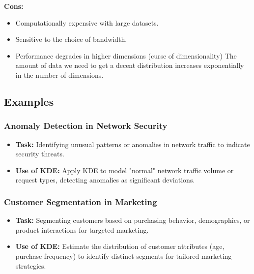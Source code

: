 \documentclass[12pt]{article}
\begin{document}
\textbf{Cons:}
\begin{itemize}
    \item Computationally expensive with large datasets.
    \item Sensitive to the choice of bandwidth.
 	\item Performance degrades in higher dimensions (curse of dimensionality) The amount of data we need to get a decent distribution increases exponentially in the number of dimensions.
\end{itemize}
\subsection{Examples}

\subsubsection{Anomaly Detection in Network Security}
\begin{itemize}
    \item \textbf{Task:} Identifying unusual patterns or anomalies in network traffic to indicate security threats.
    \item \textbf{Use of KDE:} Apply KDE to model "normal" network traffic volume or request types, detecting anomalies as significant deviations.
\end{itemize}

\subsubsection{Customer Segmentation in Marketing}
\begin{itemize}
    \item \textbf{Task:} Segmenting customers based on purchasing behavior, demographics, or product interactions for targeted marketing.
    \item \textbf{Use of KDE:} Estimate the distribution of customer attributes (age, purchase frequency) to identify distinct segments for tailored marketing strategies.
\end{itemize}
\end{document}
